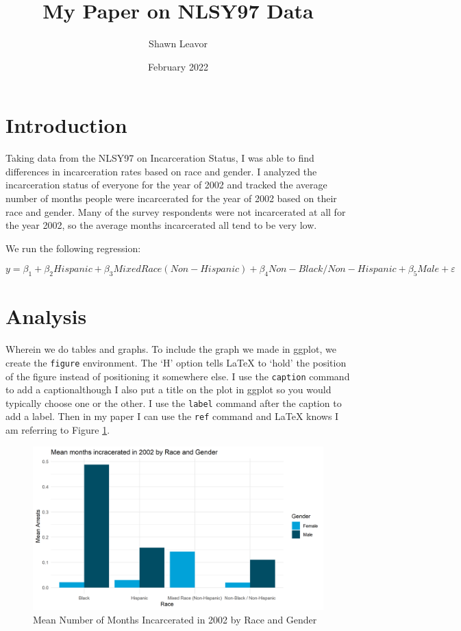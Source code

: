 \documentclass{article}
\author{Shawn Leavor}
\title{My Paper on NLSY97 Data}
\date{February 2022}
\begin{document}
\maketitle

\section{Introduction}

Taking data from the NLSY97 on Incarceration Status, I was able to find differences in incarceration rates based on race and gender. I analyzed the incarceration status of everyone for the year of 2002 and tracked the average number of months people were incarcerated for the year of 2002 based on their race and gender. Many of the survey respondents were not incarcerated at all for the year 2002, so the average months incarcerated all tend to be very low. 

We run the following regression:

\begin{equation*}
    y = \beta_1 + \beta_2 Hispanic + \beta_3 Mixed Race (Non-Hispanic)+ \beta_4 Non-Black / Non-Hispanic + \beta_5 Male + \varepsilon
\end{equation*}

\section{Analysis}

Wherein we do tables and graphs. To include the graph we made in ggplot, we create the \texttt{figure} environment. The `H' option tells LaTeX to `hold' the position of the figure instead of positioning it somewhere else. I use the \texttt{caption} command to add a caption{\textemdash}although I also put a title on the plot in ggplot so you would typically choose one or the other. I use the \texttt{label} command after the caption to add a label. Then in my paper I can use the \texttt{ref} command and LaTeX knows I am referring to Figure \ref{fig:graph}.


\begin{figure}[H]
    \begin{center}
        \includegraphics[width=.85\textwidth]{arrests_by_racegender}
    \end{center}
    \caption{Mean Number of Months Incarcerated in 2002 by Race and Gender}
    \label{fig:graph}
\end{figure}
\end{document}

